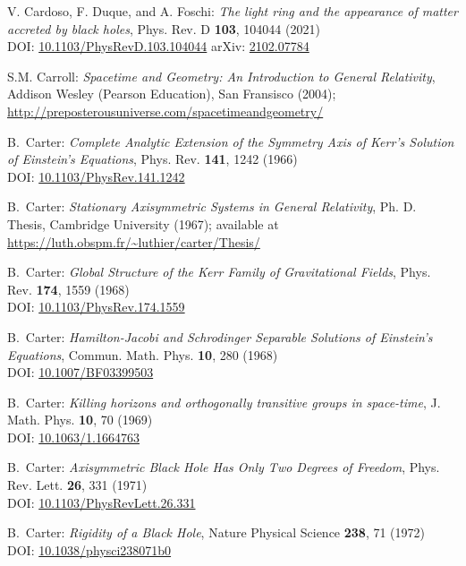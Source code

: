 \begin{thebibliography}{123}
V. Cardoso, F. Duque, and A. Foschi:
{\em The light ring and the appearance of matter accreted by black holes},
Phys. Rev. D {\bf 103}, 104044 (2021)\\
DOI: \href{https://doi.org/10.1103/PhysRevD.103.104044}{10.1103/PhysRevD.103.104044}\hfill
arXiv: \href{https://arxiv.org/abs/2102.07784}{2102.07784}

S.M. Carroll: \emph{Spacetime and Geometry: An Introduction to General Relativity},
Addison Wesley (Pearson Education), San Fransisco (2004); \\
\url{http://preposterousuniverse.com/spacetimeandgeometry/}

B.~Carter:
{\em Complete Analytic Extension of the Symmetry Axis of Kerr's Solution of Einstein's Equations},
Phys. Rev. {\bf 141}, 1242 (1966)\\
DOI: \href{https://doi.org/10.1103/PhysRev.141.1242}{10.1103/PhysRev.141.1242}

B.~Carter: {\em Stationary Axisymmetric Systems in General Relativity},
Ph. D. Thesis, Cambridge University (1967); available at\\
\url{https://luth.obspm.fr/~luthier/carter/Thesis/}

B.~Carter:
{\em Global Structure of the Kerr Family of Gravitational Fields},
Phys. Rev. {\bf 174}, 1559 (1968)\\
DOI: \href{https://doi.org/10.1103/PhysRev.174.1559}{10.1103/PhysRev.174.1559}

B.~Carter:
{\em Hamilton-Jacobi and Schrodinger Separable Solutions of Einstein's Equations},
Commun. Math. Phys. {\bf 10}, 280 (1968)\\
DOI: \href{https://doi.org/10.1007/BF03399503}{10.1007/BF03399503}

B.~Carter:
{\em Killing horizons and orthogonally transitive groups in space-time},
J. Math. Phys. {\bf 10}, 70 (1969)\\
DOI: \href{https://doi.org/10.1063/1.1664763}{10.1063/1.1664763}

B.~Carter:
{\em Axisymmetric Black Hole Has Only Two Degrees of Freedom},
Phys. Rev. Lett. {\bf 26}, 331 (1971)\\
DOI: \href{https://doi.org/10.1103/PhysRevLett.26.331}{10.1103/PhysRevLett.26.331}

B.~Carter:
{\em Rigidity of a Black Hole},
Nature Physical Science {\bf 238}, 71 (1972)\\
DOI: \href{https://doi.org/10.1038/physci238071b0}{10.1038/physci238071b0}


\end{thebibliography}
